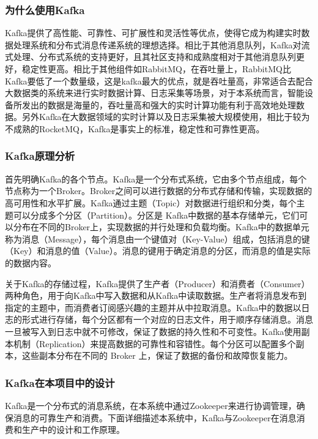 \documentclass[oneside]{xduugthesis}
\begin{document}
\subsubsection{为什么使用Kafka}

Kafka提供了高性能、可靠性、可扩展性和灵活性等优点，使得它成为构建实时数据处理系统和分布式消息传递系统的理想选择。相比于其他消息队列，Kafka对流式处理、分布式系统的支持更好，且其社区支持和成熟度相对于其他消息队列更好，稳定性更高。相比于其他组件如RabbitMQ，在吞吐量上，RabbitMQ比Kafka要低了一个数量级，这是kafka最大的优点，就是吞吐量高，非常适合去配合大数据类的系统来进行实时数据计算、日志采集等场景，对于本系统而言，智能设备所发出的数据是海量的，吞吐量高和强大的实时计算功能有利于高效地处理数据。另外Kafka在大数据领域的实时计算以及日志采集被大规模使用，相比于较为不成熟的RocketMQ，Kafka是事实上的标准，稳定性和可靠性更高。

\subsubsection{Kafka原理分析}

首先明确Kafka的各个节点。Kafka是一个分布式系统，它由多个节点组成，每个节点称为一个Broker。Broker之间可以进行数据的分布式存储和传输，实现数据的高可用性和水平扩展。Kafka通过主题（Topic）对数据进行组织和分类，每个主题可以分成多个分区（Partition）。分区是 Kafka中数据的基本存储单元，它们可以分布在不同的Broker上，实现数据的并行处理和负载均衡。Kafka中的数据单元称为消息（Message），每个消息由一个键值对（Key-Value）组成，包括消息的键（Key）和消息的值（Value）。消息的键用于确定消息的分区，而消息的值是实际的数据内容。

关于Kafka的存储过程，Kafka提供了生产者（Producer）和消费者（Consumer）两种角色，用于向Kafka中写入数据和从Kafka中读取数据。生产者将消息发布到指定的主题中，而消费者订阅感兴趣的主题并从中拉取消息。Kafka中的数据以日志的形式进行存储，每个分区都有一个对应的日志文件，用于顺序存储消息。消息一旦被写入到日志中就不可修改，保证了数据的持久性和不可变性。Kafka使用副本机制（Replication）来提高数据的可靠性和容错性。每个分区可以配置多个副本，这些副本分布在不同的 Broker 上，保证了数据的备份和故障恢复能力。

\subsubsection{Kafka在本项目中的设计}

Kafka是一个分布式的消息系统，在本系统中通过Zookeeper来进行协调管理，确保消息的可靠生产和消费。下面详细描述本系统中，Kafka与Zookeeper在消息消费和生产中的设计和工作原理。
\end{document}
